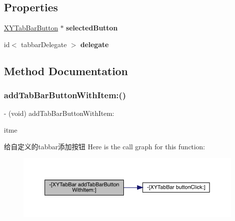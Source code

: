 \subsection*{Properties}
\begin{DoxyCompactItemize}
\item 
\mbox{\label{interface_x_y_tab_bar_ac243b5c90aee09dbe308d9cbd8063af9}} 
\mbox{\hyperlink{interface_x_y_tab_bar_button}{X\+Y\+Tab\+Bar\+Button}} $\ast$ {\bfseries selected\+Button}
\item 
\mbox{\label{interface_x_y_tab_bar_ae1745e7225fdbe7c3823095e8ed648d0}} 
id$<$ tabbar\+Delegate $>$ {\bfseries delegate}
\end{DoxyCompactItemize}


\subsection{Method Documentation}
\mbox{\label{interface_x_y_tab_bar_a88d5e58c3eefbbc798a9a50c35d5fcda}} 
\subsubsection{\texorpdfstring{add\+Tab\+Bar\+Button\+With\+Item\+:()}{addTabBarButtonWithItem:()}}
{\footnotesize\ttfamily -\/ (void) add\+Tab\+Bar\+Button\+With\+Item\+: \begin{DoxyParamCaption}\item[{(U\+I\+Tab\+Bar\+Item $\ast$)}]{itme }\end{DoxyParamCaption}}

给自定义的tabbar添加按钮 Here is the call graph for this function\+:\nopagebreak
\begin{figure}[H]
\begin{center}
\leavevmode
\includegraphics[width=350pt]{interface_x_y_tab_bar_a88d5e58c3eefbbc798a9a50c35d5fcda_cgraph}
\end{center}
\end{figure}
\mbox{\label{interface_x_y_tab_bar_a8025d345fc8661211bb1a1b5201d652d}} 
